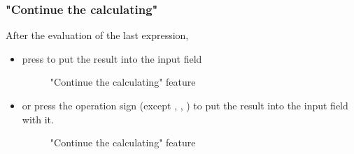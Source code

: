 \documentclass[a5paper, 10pt]{article}
\begin{document}
        \subsubsection{"Continue the calculating"}
            After the evaluation of the last expression,
            \begin{itemize}
                \item press \keys{=} to put the result into the input field
                \begin{figure}[h]
                    \centering
                    \caption{"Continue the calculating" feature}
                    \label{pic:continue_the_calculating01}
                \end{figure}
            \pagebreak
                \item or press the operation sign (except , , ) to put the result into the input field with it.
                \begin{figure}[h]
                    \centering
                    \caption{"Continue the calculating" feature}
                    \label{pic:continue_the_calculating02}
                \end{figure}
            \end{itemize}
\end{document}
